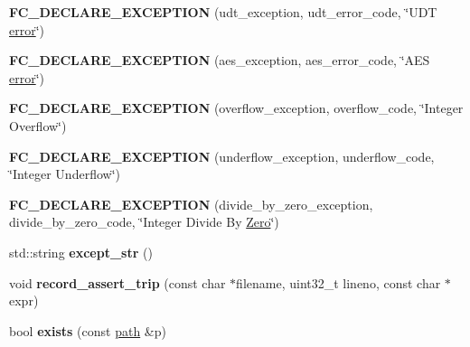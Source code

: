 \begin{DoxyCompactItemize}
\mbox{\label{namespacefc_a58016c94cbc3d339bbb0f2016b0d449c}} 
{\bfseries F\+C\+\_\+\+D\+E\+C\+L\+A\+R\+E\+\_\+\+E\+X\+C\+E\+P\+T\+I\+ON} (udt\+\_\+exception, udt\+\_\+error\+\_\+code, \char`\"{}U\+DT \mbox{\hyperlink{structerror}{error}}\char`\"{})
\item 
\mbox{\label{namespacefc_a8609e49b94b7368af5d6659d376b6350}} 
{\bfseries F\+C\+\_\+\+D\+E\+C\+L\+A\+R\+E\+\_\+\+E\+X\+C\+E\+P\+T\+I\+ON} (aes\+\_\+exception, aes\+\_\+error\+\_\+code, \char`\"{}A\+ES \mbox{\hyperlink{structerror}{error}}\char`\"{})
\item 
\mbox{\label{namespacefc_afeb0290df9b8b0856ebf9f30894a448b}} 
{\bfseries F\+C\+\_\+\+D\+E\+C\+L\+A\+R\+E\+\_\+\+E\+X\+C\+E\+P\+T\+I\+ON} (overflow\+\_\+exception, overflow\+\_\+code, \char`\"{}Integer Overflow\char`\"{})
\item 
\mbox{\label{namespacefc_a6dc26c87aba3f7d662afbe11237a4b00}} 
{\bfseries F\+C\+\_\+\+D\+E\+C\+L\+A\+R\+E\+\_\+\+E\+X\+C\+E\+P\+T\+I\+ON} (underflow\+\_\+exception, underflow\+\_\+code, \char`\"{}Integer Underflow\char`\"{})
\item 
\mbox{\label{namespacefc_af22200137421e387bbd933e17123634b}} 
{\bfseries F\+C\+\_\+\+D\+E\+C\+L\+A\+R\+E\+\_\+\+E\+X\+C\+E\+P\+T\+I\+ON} (divide\+\_\+by\+\_\+zero\+\_\+exception, divide\+\_\+by\+\_\+zero\+\_\+code, \char`\"{}Integer Divide By \mbox{\hyperlink{struct_zero}{Zero}}\char`\"{})
\item 
\mbox{\label{namespacefc_a2bbff129626558fab1e343fcd5ad8bc5}} 
std\+::string {\bfseries except\+\_\+str} ()
\item 
\mbox{\label{namespacefc_a4e83f6ac6009aff9e3cef3db1cc6b605}} 
void {\bfseries record\+\_\+assert\+\_\+trip} (const char $\ast$filename, uint32\+\_\+t lineno, const char $\ast$expr)
\item 
\mbox{\label{namespacefc_a3fcf0d920aea28014aacae50a51d8485}} 
bool {\bfseries exists} (const \mbox{\hyperlink{classfc_1_1path}{path}} \&p)
\item 
\mbox{\label{namespacefc_ab123bfeadf918cc293ecad88bca7c499}} 

\end{DoxyCompactItemize}
